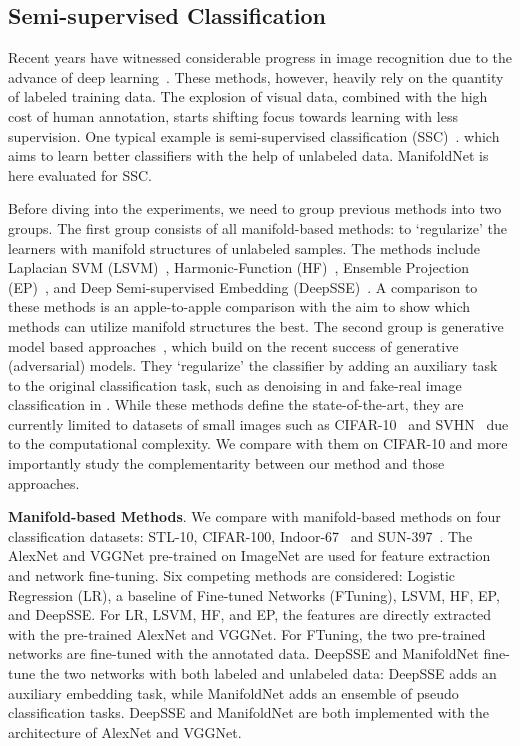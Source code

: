 \documentclass{bmvc2k}
\begin{document}
\subsection{Semi-supervised Classification}
Recent years have witnessed considerable progress in image recognition
due to the advance of deep
learning~\cite{deepnet:nips12,vgg16,resnet}. These methods, however,
heavily rely on the quantity of labeled training data. The
explosion of visual data, combined with the high cost of human
annotation, starts shifting focus towards learning with less supervision. One typical
example is semi-supervised classification (SSC)~\cite{Weston:2008,dai:EnPro:iccv13, kingma2014semi, springenberg2015unsupervised, ladder:network, distributional:smoothing, improved:GAN, hoffer2016semi}. which aims to learn better classifiers with the help of unlabeled
data. ManifoldNet is here evaluated for SSC. 

Before diving into the experiments, we need to group previous methods into two groups. The first group consists of all manifold-based methods: to `regularize' the learners with  manifold structures of unlabeled samples. The methods include Laplacian SVM (LSVM)~\cite{LapSVM}, Harmonic-Function 
(HF)~\cite{Zhu:Harmonic:03}, Ensemble Projection
(EP)~\cite{dai:EnPro:iccv13}, and Deep Semi-supervised Embedding
(DeepSSE)~\cite{Weston:2008}. A comparison to these methods is an apple-to-apple comparison with the aim to show which methods can utilize manifold structures the best. 
The second group is generative model based approaches~\cite{kingma2014semi, springenberg2015unsupervised, ladder:network, distributional:smoothing, improved:GAN}, which build on the recent success of generative (adversarial) models. They `regularize' the classifier by adding an auxiliary task to the original classification task, such as denoising in \cite{ladder:network} and fake-real image classification in \cite{improved:GAN}. While these methods define the state-of-the-art, they are currently limited to datasets of small images such as CIFAR-10~\cite{cifar} and SVHN~\cite{svhn} due to the computational complexity. We compare with them on CIFAR-10 and more importantly study the complementarity between our method and those approaches. 

\noindent
\textbf{Manifold-based Methods}. We compare with manifold-based methods on four classification datasets:  STL-10, CIFAR-100, Indoor-67~\cite{Indoor} and SUN-397~\cite{SUN397}.  
The AlexNet and VGGNet pre-trained on ImageNet are used for feature extraction and network
fine-tuning. Six competing methods are considered: Logistic Regression
(LR), a baseline of Fine-tuned Networks
(FTuning), LSVM, HF, EP, and DeepSSE. For LR, LSVM, HF, and EP, the features are directly
extracted with the pre-trained AlexNet and VGGNet. For FTuning, the
two pre-trained networks are fine-tuned with the annotated
data. DeepSSE and ManifoldNet fine-tune the two networks with both
labeled and unlabeled data: DeepSSE adds an auxiliary embedding task,
while ManifoldNet adds an ensemble of pseudo classification
tasks. DeepSSE and ManifoldNet are both implemented with the
architecture of AlexNet and VGGNet.
\end{document}
